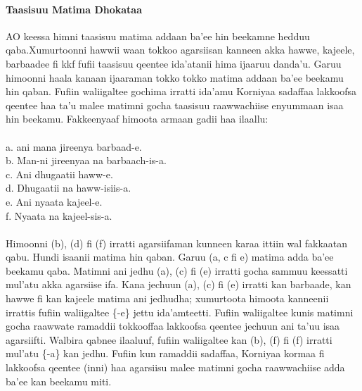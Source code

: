 \documentclass[11pt,b5paper]{book}
\begin{document}
\paragraph{Taasisuu Matima Dhokataa}
AO keessa himni taasisuu matima addaan ba’ee hin beekamne hedduu qaba.Xumurtoonni hawwii waan tokkoo agarsiisan kanneen akka hawwe, kajeele, barbaadee fi kkf fufii taasisuu qeentee ida’atanii hima ijaaruu danda’u. Garuu himoonni haala kanaan ijaaraman tokko tokko matima addaan ba’ee beekamu
hin qaban. Fufiin waliigaltee gochima irratti ida’amu Korniyaa sadaffaa lakkoofsa qeentee haa ta’u malee matimni gocha taasisuu raawwachiise enyummaan isaa hin beekamu. Fakkeenyaaf himoota armaan gadii haa ilaallu:\\
\\
a. ani mana jireenya barbaad-e.\\
b. Man-ni jireenyaa na barbaach-is-a.\\
c. Ani dhugaatii haww-e.\\
d. Dhugaatii na haww-isiis-a.\\
e. Ani nyaata kajeel-e.\\
f. Nyaata na kajeel-sis-a.\\
\\
Himoonni (b), (d) fi (f) irratti agarsiifaman kunneen karaa ittiin wal fakkaatan qabu. Hundi isaanii matima hin qaban. Garuu (a, c fi e) matima adda ba’ee beekamu qaba. Matimni ani jedhu (a), (c) fi (e) irratti gocha sammuu keessatti mul’atu akka agarsiise ifa. Kana jechuun (a), (c) fi (e) irratti kan barbaade, kan hawwe fi kan kajeele matima ani jedhudha; xumurtoota himoota kanneenii irrattis fufiin waliigaltee \{-e\} jettu ida’amteetti. Fufiin waliigaltee kunis matimni gocha raawwate ramaddii tokkooffaa lakkoofsa qeentee jechuun ani ta’uu isaa agarsiifti. Walbira qabnee ilaaluuf, fufiin waliigaltee kan (b), (f) fi (f) irratti mul’atu \{-a\} kan jedhu. Fufiin kun ramaddii sadaffaa, Korniyaa kormaa fi lakkoofsa qeentee (inni) haa agarsiisu malee matimni gocha raawwachiise adda ba’ee kan beekamu miti.
\end{document}
